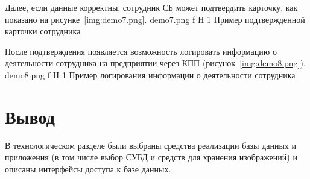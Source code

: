 Далее, если данные корректны, сотрудник СБ может подтвердить карточку, как показано на рисунке~\ref{img:demo7.png}.
	{demo7.png}
	{f}
	{H}
	{1\textwidth}
	{Пример подтвержденной карточки сотрудника}
	
\clearpage

После подтверждения появляется возможность логировать информацию о деятельности сотрудника на предприятии через КПП (рисунок~\ref{img:demo8.png}).
	{demo8.png}
	{f}
	{H}
	{1\textwidth}
	{Пример логирования информации о деятельности сотрудника}

\section*{Вывод}

В технологическом разделе были выбраны средства реализации базы данных и приложения (в том числе выбор СУБД и средств для хранения изображений) и описаны интерфейсы доступа к базе данных.
